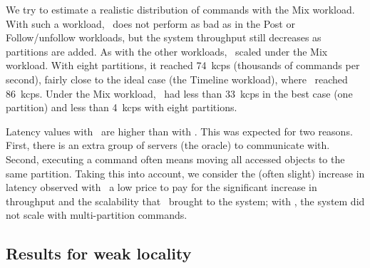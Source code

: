 We try to estimate a realistic distribution of commands with the Mix workload.
With such a workload, \ssmr\ does not perform as bad as in the Post or Follow/unfollow workloads, but the system throughput still decreases as partitions are added.
As with the other workloads, \dssmr\ scaled under the Mix workload.
With eight partitions, it reached 74~kcps (thousands of commands per second), fairly close to the ideal case (the Timeline workload), where \dssmr\ reached 86~kcps.
Under the Mix workload, \ssmr\ had less than 33~kcps in the best case (one partition) and less than 4~kcps with eight partitions.

Latency values with \dssmr\ are higher than with \ssmr{}.
This was expected for two reasons. First, there is an extra group of servers (the oracle) to communicate with.
Second, executing a command often means moving all accessed objects to the same partition.
Taking this into account, we consider the (often slight) increase in latency observed with \dssmr\ a low price to pay for the significant increase in throughput and the scalability that \dssmr\ brought to the system; with \ssmr{}, the system did not scale with multi-partition commands.



\subsection{Results for weak locality}
\label{sec:evaluation:weakloc}